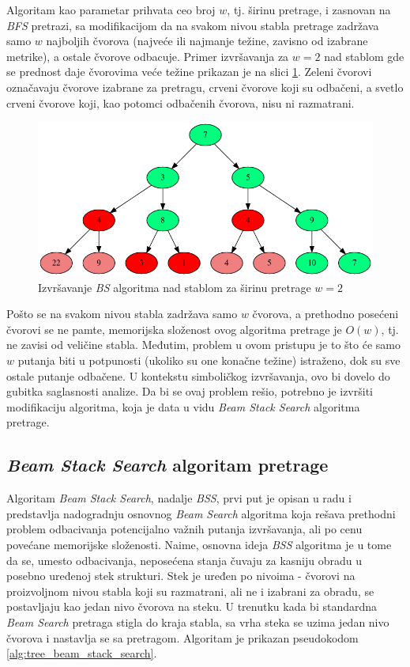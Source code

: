 \documentclass[a4paper]{article}
\begin{document}
Algoritam kao parametar prihvata ceo broj $w$, tj. širinu pretrage, i zasnovan na \textit{BFS} pretrazi, sa modifikacijom da na svakom nivou stabla pretrage zadržava samo $w$ najboljih čvorova (najveće ili najmanje težine, zavisno od izabrane metrike), a ostale čvorove odbacuje. Primer izvršavanja za $w = 2$ nad stablom gde se prednost daje čvorovima veće težine prikazan je na slici \ref{fig:beam_search}. Zeleni čvorovi označavaju čvorove izabrane za pretragu, crveni čvorove koji su odbačeni, a svetlo crveni čvorove koji, kao potomci odbačenih čvorova, nisu ni razmatrani.

\begin{figure}[h!]
    \centering
    \includegraphics[width=\linewidth]{ilustracije/beam_search_primer.png}
    \caption{Izvršavanje \textit{BS} algoritma nad stablom za širinu pretrage $w = 2$}
    \label{fig:beam_search}
\end{figure}

Pošto se na svakom nivou stabla zadržava samo $w$ čvorova, a prethodno posećeni čvorovi se ne pamte, memorijska složenost ovog algoritma pretrage je $O(w)$, tj. ne zavisi od veličine stabla. Međutim, problem u ovom pristupu je to što će samo $w$ putanja biti u potpunosti (ukoliko su one konačne težine) istraženo, dok su sve ostale putanje odbačene. U kontekstu simboličkog izvršavanja, ovo bi dovelo do gubitka saglasnosti analize. Da bi se ovaj problem rešio, potrebno je izvršiti modifikaciju algoritma, koja je data u vidu \textit{Beam Stack Search} algoritma pretrage.

\subsection{\textit{Beam Stack Search} algoritam pretrage}

Algoritam \textit{Beam Stack Search}, nadalje \textit{BSS}, prvi put je opisan u radu \cite{BeamStackSearch-10.5555/3037062.3037074} i predstavlja nadogradnju osnovnog \textit{Beam Search} algoritma koja rešava prethodni problem odbacivanja potencijalno važnih putanja izvršavanja, ali po cenu povećane memorijske složenosti. Naime, osnovna ideja \textit{BSS} algoritma je u tome da se, umesto odbacivanja, neposećena stanja čuvaju za kasniju obradu u posebno uređenoj stek strukturi. Stek je uređen po nivoima - čvorovi na proizvoljnom nivou stabla koji su razmatrani, ali ne i izabrani za obradu, se postavljaju kao jedan nivo čvorova na steku. U trenutku kada bi standardna \textit{Beam Search} pretraga stigla do kraja stabla, sa vrha steka se uzima jedan nivo čvorova i nastavlja se sa pretragom. Algoritam je prikazan pseudokodom \ref{alg:tree_beam_stack_search}.
\end{document}
